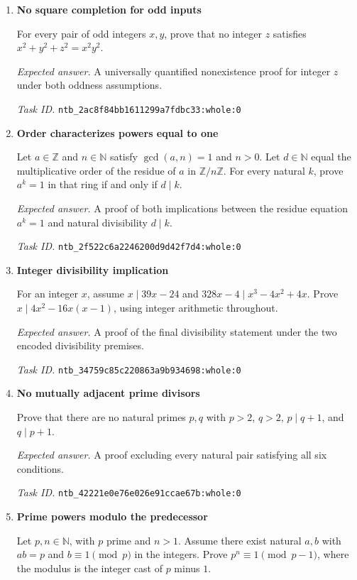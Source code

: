 \documentclass[11pt]{article}
\newcommand{\pth}[1]{\nolinkurl{#1}}
\begin{document}
\begin{enumerate}[label={DEV \arabic*.},leftmargin=4.5em,itemsep=1em]
\item \textbf{No square completion for odd inputs}\label{qn:dev:8}

For every pair of odd integers $x,y$, prove that no integer $z$ satisfies $x^2+y^2+z^2=x^2y^2$.

\emph{Expected answer.} A universally quantified nonexistence proof for integer $z$ under both oddness assumptions.

\emph{Task ID.} \pth{ntb_2ac8f84bb1611299a7fdbc33:whole:0}

\item \textbf{Order characterizes powers equal to one}\label{qn:dev:9}

Let $a\in\mathbb Z$ and $n\in\mathbb N$ satisfy $\gcd(a,n)=1$ and $n>0$. Let $d\in\mathbb N$ equal the multiplicative order of the residue of $a$ in $\mathbb Z/n\mathbb Z$. For every natural $k$, prove $a^k=1$ in that ring if and only if $d\mid k$.

\emph{Expected answer.} A proof of both implications between the residue equation $a^k=1$ and natural divisibility $d\mid k$.

\emph{Task ID.} \pth{ntb_2f522c6a2246200d9d42f7d4:whole:0}

\item \textbf{Integer divisibility implication}\label{qn:dev:10}

For an integer $x$, assume $x\mid39x-24$ and $328x-4\mid x^3-4x^2+4x$. Prove $x\mid4x^2-16x(x-1)$, using integer arithmetic throughout.

\emph{Expected answer.} A proof of the final divisibility statement under the two encoded divisibility premises.

\emph{Task ID.} \pth{ntb_34759c85c220863a9b934698:whole:0}

\item \textbf{No mutually adjacent prime divisors}\label{qn:dev:11}

Prove that there are no natural primes $p,q$ with $p>2$, $q>2$, $p\mid q+1$, and $q\mid p+1$.

\emph{Expected answer.} A proof excluding every natural pair satisfying all six conditions.

\emph{Task ID.} \pth{ntb_42221e0e76e026e91ccae67b:whole:0}

\item \textbf{Prime powers modulo the predecessor}\label{qn:dev:12}

Let $p,n\in\mathbb N$, with $p$ prime and $n>1$. Assume there exist natural $a,b$ with $ab=p$ and $b\equiv1\pmod p$ in the integers. Prove $p^n\equiv1\pmod{p-1}$, where the modulus is the integer cast of $p$ minus $1$.


\end{enumerate}
\end{document}
